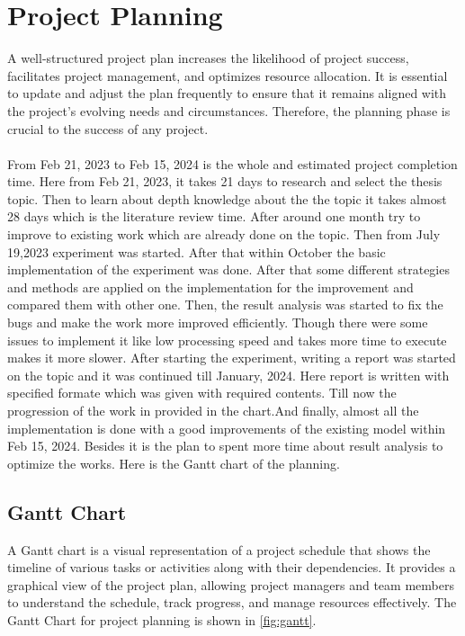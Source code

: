 \documentclass[a4paper,12pt,oneside]{book}
\begin{document}
\section{Project Planning}
A well-structured project plan increases the likelihood of project success, facilitates project management, and optimizes resource allocation. It is essential to update and adjust the plan frequently to ensure that it remains aligned with the project's evolving needs and circumstances. Therefore, the planning phase is crucial to the success of any project.\\\\
From Feb 21, 2023 to Feb 15, 2024 is the whole and estimated project completion time.
Here from Feb 21, 2023, it takes 21 days to research and select the thesis topic. Then to learn about depth knowledge about the the topic it takes almost 28 days which is the literature review time. After around one month try to improve to existing work which are already done on the topic. Then from July 19,2023 experiment was started. After that
within October the basic implementation of the experiment was done. After that some different strategies and methods are applied on the implementation for the improvement and compared them with other one. Then, the result analysis was started to fix the bugs and make the work more improved efficiently. Though there were some issues to implement it like low processing speed and takes more time to execute makes it more slower. After starting the experiment, writing a report was started on the topic and it was continued till January, 2024.
Here report is written with specified formate which was given with required contents. Till now the progression of the work in provided in the chart.And finally, almost all the implementation is done with a good improvements of the existing model within Feb 15, 2024. Besides it is the plan to spent more time about result analysis to optimize the works. Here is the Gantt chart of the planning.
\subsection{Gantt Chart}
A Gantt chart is a visual representation of a project schedule that shows the timeline of various tasks or activities along with their dependencies. It provides a graphical view of the project plan, allowing project managers and team members to understand the schedule, track progress, and manage resources effectively.
The Gantt Chart for project planning is shown in \autoref{fig:gantt}.
\end{document}
